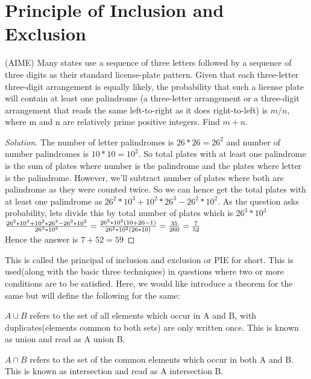 \section{Principle of Inclusion and Exclusion}
\begin{example}
    (AIME) Many states use a sequence of three letters followed by a sequence of three digits as their standard license-plate pattern. Given that each three-letter three-digit arrangement is equally likely, the probability that such a license plate will contain at least one palindrome (a three-letter arrangement or a three-digit arrangement that reads the same left-to-right as it does right-to-left) is $m/n$, where m and n are relatively prime positive integers. Find $m + n$.
\end{example}
\begin{proof}
    [Solution]
    The number of letter palindromes is $26*26=26^2$ and number of number palindromes is $10*10=10^2$. So total plates with at least one palindrome is the sum of plates where number is the palindrome and the plates where letter is the palindrome. However, we'll subtract number of plates where both are palindrome as they were counted twice. So we can hence get the total plates with at least one palindrome as $26^2*10^3+10^2*26^3-26^2*10^2$. As the question asks probability, lets divide this by total number of plates which is $26^3*10^3$\\ 
    $\frac{26^2*10^3+10^2*26^3-26^2*10^2}{26^3*10^3} \\
    = \frac{26^2*10^2(10+26-1)}{26^2*10^2(26*10)} \\
    =\frac{35}{260}=\frac{7}{52}$\\
    Hence the answer is $7+52=59$
\end{proof}
This is called the principal of inclusion and exclusion or PIE for short. This is used(along with the basic three techniques) in questions where two or more conditions are to be satisfied. Here, we would like introduce a theorem for the same but will define the following for the same:\\
\begin{definition}
$A \cup B$ refers to the set of all elements which occur in A and B, with duplicates(elements common to both sets) are only written once. This is known as union and read as A union B.    
\end{definition}
\begin{definition}
    $A \cap B$ refers to the set of the common elements which occur in both A and B. This is known as intersection and read as A intersection B.    
\end{definition}
